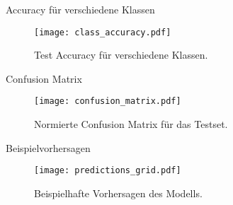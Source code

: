 
\begin{frame}{Accuracy für verschiedene Klassen}
    \begin{figure}
        \centering
        \texttt{[image: class\_accuracy.pdf]}
        \caption{Test Accuracy für verschiedene Klassen.}
    \end{figure}
\end{frame}


\begin{frame}{Confusion Matrix}
    \begin{figure}
        \centering
        \texttt{[image: confusion\_matrix.pdf]}
        \caption{Normierte Confusion Matrix für das Testset.}
    \end{figure}
\end{frame}


\begin{frame}{Beispielvorhersagen}
    \begin{figure}
        \centering
        \texttt{[image: predictions\_grid.pdf]}
        \caption{Beispielhafte Vorhersagen des Modells.}
    \end{figure}
\end{frame}
